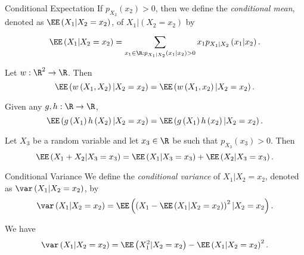 \documentclass[stat333]{subfiles}
\begin{document}
    \begin{definition}{Conditional Expectation}{}
        If $p_{X_2}\left( x_2 \right)>0$, then we define the \emph{conditional mean}, denoted as $\EE\left( X_1|X_2=x_2 \right)$, of $X_1|\left( X_2=x_2 \right)$ by
        \begin{equation*}
            \EE\left( X_1|X_2=x_2 \right) = \sum^{}_{x_1\in\R:p_{X_1|X_2}\left( x_1|x_2 \right)>0}x_1p_{X_1|X_2}\left( x_1|x_2 \right).
        \end{equation*}
    \end{definition}

    \begin{prop}{}
        Let $w:\R^2\to\R$. Then
        \begin{equation*}
            \EE\left( w\left( X_1,X_2 \right)|X_2=x_2 \right) = \EE\left( w\left( X_1,x_2 \right)|X_2=x_2 \right).
        \end{equation*}
    \end{prop}

    \begin{cor}{}
        Given any $g,h:\R\to\R$,
        \begin{equation*}
            \EE\left( g\left( X_1 \right)h\left( X_2 \right)|X_2=x_2 \right) = \EE\left( g\left( X_1 \right)h\left( x_2 \right)|X_2=x_2 \right).
        \end{equation*}
    \end{cor}	

    \begin{cor}{}
        Let $X_3$ be a random variable and let $x_3\in\R$ be such that $p_{X_3}\left( x_3 \right)>0$. Then
        \begin{equation*}
            \EE\left( X_1+X_2|X_3=x_3 \right) = \EE\left( X_1|X_3=x_3 \right) + \EE\left( X_2|X_3=x_3 \right).
        \end{equation*}
    \end{cor}	

    \begin{definition}{Conditional Variance}{}
        We define the \emph{conditional variance} of $X_1|X_2=x_2$, denoted as $\var\left( X_1|X_2=x_2 \right)$, by
        \begin{equation*}
            \var\left( X_1|X_2=x_2 \right)=\EE\left( \left( X_1-\EE\left( X_1|X_2=x_2 \right) \right)^{2}|X_2=x_2 \right).
        \end{equation*}
    \end{definition}

    \begin{prop}{}
        We have
        \begin{equation*}
            \var\left( X_1|X_2=x_2 \right) = \EE\left( X_1^{2}|X_2=x_2 \right)-\EE\left( X_1|X_2=x_2 \right)^{2}.
        \end{equation*}
    \end{prop}
\end{document}
